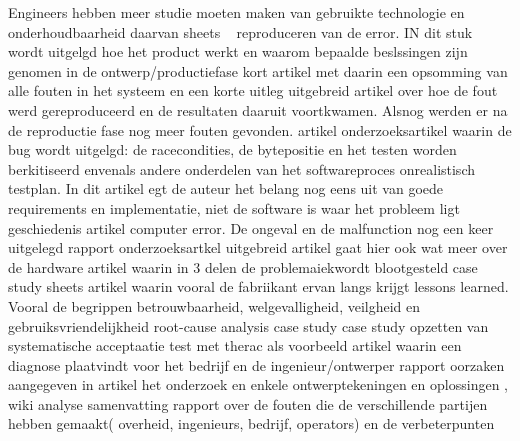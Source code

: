 Engineers hebben meer studie moeten maken van gebruikte technologie en onderhoudbaarheid daarvan 
sheets
\cite{rogaway2004therac25}
~\cite{wikiTherac25}
reproduceren van de error. IN dit stuk wordt uitgelgd hoe het product werkt en waarom bepaalde beslssingen zijn genomen in de ontwerp/productiefase
\cite{lynch2017theracRaceConditions}
kort artikel met daarin een opsomming van alle fouten in het systeem en een korte uitleg
\cite{lim1998theracdisaster}
uitgebreid artikel over hoe de fout werd gereproduceerd en de resultaten daaruit voortkwamen. Alsnog werden er na de reproductie fase nog meer fouten gevonden.
\cite{fabio26102015therac25}
artikel
\cite{ethicsunwrappedTherac25}
onderzoeksartikel waarin de bug wordt uitgelgd: de racecondities, de bytepositie en het testen worden berkitiseerd envenals andere onderdelen van het softwareproces
onrealistisch testplan. In dit artikel egt de auteur het belang nog eens uit van goede requirements en implementatie, niet de software is waar het probleem ligt
geschiedenis
\cite{casesHistoryTherac25}
artikel
\cite{caballero2019Therac25}
computer error. De ongeval en de malfunction nog een keer uitgelegd
\cite{rose1994theracFatalDose}
rapport
\cite{levesonMITTherac25}
\cite{grant1978theracevaluation}
onderzoeksartkel
\cite{turnerTheracAccidentsInvestigations}
\cite{turner1993TheracAccidentsInvestigations}
uitgebreid artikel gaat hier ook wat meer over de hardware
\cite{wang2017industrialdesignengineering}
artikel waarin in 3 delen de problemaiekwordt blootgesteld
\cite{levesonturner1993theracpart2}
case study sheets
artikel waarin vooral de fabriikant ervan langs krijgt
\cite{porelloTheraccFailure}
lessons learned. Vooral de begrippen betrouwbaarheid, welgevalligheid, veilgheid en gebruiksvriendelijkheid
\cite{theracIncidents}
root-cause analysis
case study
\cite{huffbrown2004casestudyethicatherac}
case study
\cite{sebowikimedicalradiation}
opzetten van systematische acceptaatie test met therac als voorbeeld
\cite{hsia1995testtherac25}
artikel waarin een diagnose plaatvindt voor het bedrijf en de ingenieur/ontwerper
\cite{magsilvaTheracTesting}
rapport
oorzaken aangegeven in artikel
\cite{chemeuropetherac25}
het onderzoek en enkele ontwerptekeningen en oplossingen
\cite{statsenko10102016Therackillerbug}
\cite{therac25casestudy}
\cite{thomas1994theracinLotos},
\cite{twitter2019programmerbehindtherac}
wiki
\cite{wikibookstherac}
analyse
\cite{bozdagTherac25}
samenvatting
\cite{levesonTurnerTheracAbstract}
rapport over de fouten die de verschillende partijen hebben gemaakt( overheid, ingenieurs, bedrijf, operators) en de verbeterpunten
